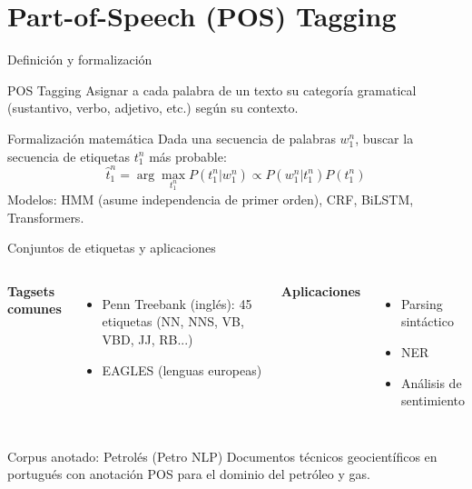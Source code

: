 \documentclass[aspectratio=169, 10pt, xcolor=table]{beamer}
\begin{document}
\section{Part-of-Speech (POS) Tagging}

\begin{frame}{Definición y formalización}
    \begin{block}{POS Tagging}
        Asignar a cada palabra de un texto su categoría gramatical (sustantivo, verbo, adjetivo, etc.) según su contexto.
    \end{block}
    \begin{block}{Formalización matemática}
        Dada una secuencia de palabras $w_1^n$, buscar la secuencia de etiquetas $t_1^n$ más probable:
        \[
        \hat{t}_1^n = \arg\max_{t_1^n} P(t_1^n | w_1^n) \propto P(w_1^n | t_1^n) P(t_1^n)
        \]
        Modelos: HMM (asume independencia de primer orden), CRF, BiLSTM, Transformers.
    \end{block}
\end{frame}

\begin{frame}{Conjuntos de etiquetas y aplicaciones}
    \begin{columns}[t]
        \textbf{Tagsets comunes}
        \begin{itemize}
            \item Penn Treebank (inglés): 45 etiquetas (NN, NNS, VB, VBD, JJ, RB...)
            \item EAGLES (lenguas europeas)
        \end{itemize}
        \textbf{Aplicaciones}
        \begin{itemize}
            \item Parsing sintáctico
            \item NER
            \item Análisis de sentimiento
        \end{itemize}
    \end{columns}
    \vspace{0.3cm}
    \begin{exampleblock}{Corpus anotado: Petrolés (Petro NLP)}
        Documentos técnicos geocientíficos en portugués con anotación POS para el dominio del petróleo y gas.
    \end{exampleblock}
\end{frame}
\end{document}
